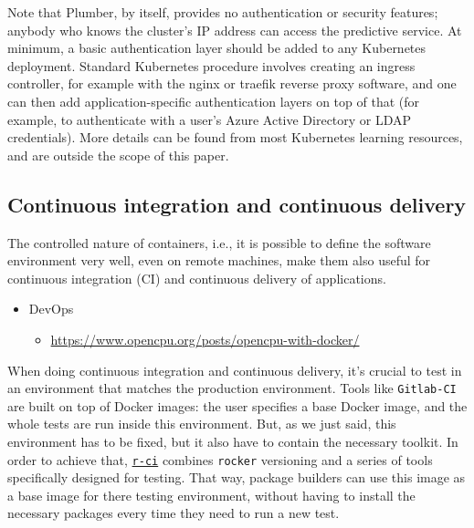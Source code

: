 Note that Plumber, by itself, provides no authentication or security
features; anybody who knows the cluster's IP address can access the
predictive service. At minimum, a basic authentication layer should be
added to any Kubernetes deployment. Standard Kubernetes procedure
involves creating an ingress controller, for example with the nginx or
traefik reverse proxy software, and one can then add
application-specific authentication layers on top of that (for example,
to authenticate with a user's Azure Active Directory or LDAP
credentials). More details can be found from most Kubernetes learning
resources, and are outside the scope of this paper.

\hypertarget{continuous-integration-and-continuous-delivery-colinfaynoamross-colinfay}{%
\subsection{\texorpdfstring{Continuous integration and continuous
delivery
\citep[\citet{ColinFay}]{noamross}}{Continuous integration and continuous delivery , @ColinFay{[}@noamross, @ColinFay{]}}}\label{continuous-integration-and-continuous-delivery-colinfaynoamross-colinfay}}

\label{cicd}

The controlled nature of containers, i.e., it is possible to define the
software environment very well, even on remote machines, make them also
useful for continuous integration (CI) and continuous delivery of
applications.

\begin{itemize}
\tightlist
\item
  DevOps

  \begin{itemize}
  \tightlist
  \item
    \url{https://www.opencpu.org/posts/opencpu-with-docker/}
  \end{itemize}
\end{itemize}

When doing continuous integration and continuous delivery, it's crucial
to test in an environment that matches the production environment. Tools
like \texttt{Gitlab-CI} are built on top of Docker images: the user
specifies a base Docker image, and the whole tests are run inside this
environment. But, as we just said, this environment has to be fixed, but
it also have to contain the necessary toolkit. In order to achieve that,
\href{https://github.com/ColinFay/r-ci}{\texttt{r-ci}} combines
\texttt{rocker} versioning and a series of tools specifically designed
for testing. That way, package builders can use this image as a base
image for there testing environment, without having to install the
necessary packages every time they need to run a new test.

